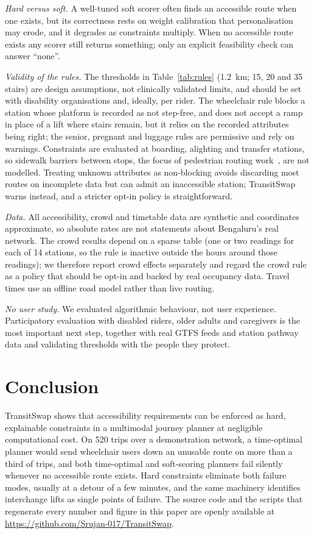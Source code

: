 \documentclass[conference]{IEEEtran}
\begin{document}
\textit{Hard versus soft.} A well-tuned soft scorer often finds an accessible route when one exists, but its correctness rests on weight calibration that personalisation may erode, and it degrades as constraints multiply. When no accessible route exists any scorer still returns something; only an explicit feasibility check can answer ``none''.

\textit{Validity of the rules.} The thresholds in Table~\ref{tab:rules} (1.2~km; 15, 20 and 35 stairs) are design assumptions, not clinically validated limits, and should be set with disability organisations and, ideally, per rider. The wheelchair rule blocks a station whose platform is recorded as not step-free, and does not accept a ramp in place of a lift where stairs remain, but it relies on the recorded attributes being right; the senior, pregnant and luggage rules are permissive and rely on warnings. Constraints are evaluated at boarding, alighting and transfer stations, so sidewalk barriers between stops, the focus of pedestrian routing work~\cite{naghdizadegan2025sidewalk,majic2026osm,ozdemir2025routes}, are not modelled. Treating unknown attributes as non-blocking avoids discarding most routes on incomplete data but can admit an inaccessible station; TransitSwap warns instead, and a stricter opt-in policy is straightforward.

\textit{Data.} All accessibility, crowd and timetable data are synthetic and coordinates approximate, so absolute rates are not statements about Bengaluru's real network. The crowd results depend on a sparse table (one or two readings for each of 14 stations, so the rule is inactive outside the hours around those readings); we therefore report crowd effects separately and regard the crowd rule as a policy that should be opt-in and backed by real occupancy data. Travel times use an offline road model rather than live routing.

\textit{No user study.} We evaluated algorithmic behaviour, not user experience. Participatory evaluation with disabled riders, older adults and caregivers is the most important next step, together with real GTFS feeds and station pathway data and validating thresholds with the people they protect.

\section{Conclusion}\label{sec:conclusion}

TransitSwap shows that accessibility requirements can be enforced as hard, explainable constraints in a multimodal journey planner at negligible computational cost. On 520 trips over a demonstration network, a time-optimal planner would send wheelchair users down an unusable route on more than a third of trips, and both time-optimal and soft-scoring planners fail silently whenever no accessible route exists. Hard constraints eliminate both failure modes, usually at a detour of a few minutes, and the same machinery identifies interchange lifts as single points of failure. The source code and the scripts that regenerate every number and figure in this paper are openly available at \url{https://github.com/Srujan-017/TransitSwap}.
\end{document}
